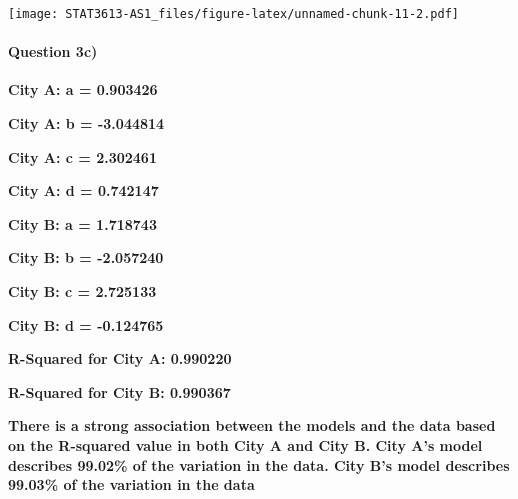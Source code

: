\documentclass[]{article}
\let\oldparagraph\paragraph
\renewcommand{\paragraph}[1]{\oldparagraph{#1}\mbox{}}
\begin{document}
\texttt{[image: STAT3613-AS1\_files/figure-latex/unnamed-chunk-11-2.pdf]}

\hypertarget{question-3c}{%
\paragraph{Question 3c)}\label{question-3c}}

\textbf{City A: a = 0.903426}

\textbf{City A: b = -3.044814}

\textbf{City A: c = 2.302461}

\textbf{City A: d = 0.742147}

\textbf{City B: a = 1.718743}

\textbf{City B: b = -2.057240}

\textbf{City B: c = 2.725133}

\textbf{City B: d = -0.124765}

\textbf{R-Squared for City A: 0.990220}

\textbf{R-Squared for City B: 0.990367}

\textbf{There is a strong association between the models and the data
based on the R-squared value in both City A and City B. City A's model
describes 99.02\% of the variation in the data. City B's model describes
99.03\% of the variation in the data}
\end{document}
